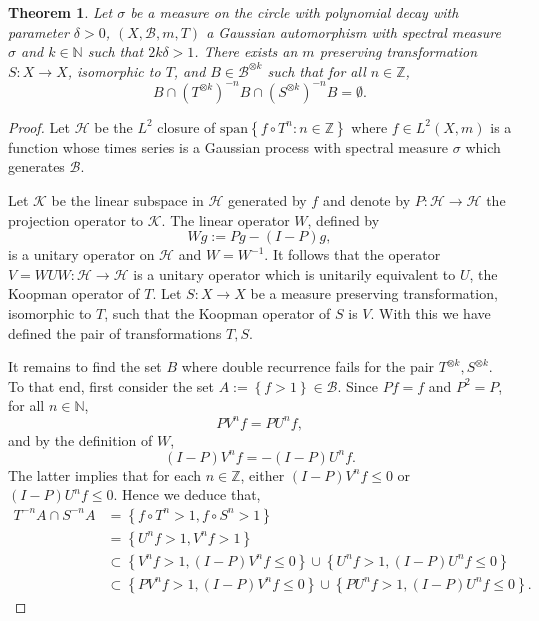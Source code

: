 \documentclass[12pt,reqno]{amsart}
\newcommand{\N}{\mathbb{N}}
\newcommand{\Z}{\mathbb{Z}}
\newcommand{\B}{\mathcal{B}}
\newtheorem{thm}{Theorem}[section]
\theoremstyle{definition}
\begin{document}
\begin{thm}\label{thm: Gaussian no rec}
Let $\sigma$ be a measure on the circle with polynomial decay with parameter $\delta>0$, $\left(X,\mathcal{B},m,T\right)$ a Gaussian automorphism with spectral measure $\sigma$ and $k\in\mathbb{N}$ such that $2k\delta>1$. There exists an $m$ preserving transformation $S:X\to X$, isomorphic to $T$, and  $B\in\B^{\otimes k}$ such that for all $n\in\Z$, 
\[
B\cap \left(T^{\otimes k}\right)^{-n}B\cap \left(S^{\otimes k}\right)^{-n}B = \emptyset. 
\]
\end{thm}
\begin{proof}
Let $\mathcal{H}$ be the $L^2$ closure of $\mathrm{span}\left\{f\circ T^n:n\in\Z\right\}$ where $f\in L^2(X,m)$ is a function whose times series is a Gaussian process with spectral measure $\sigma$ which generates $\mathcal{B}$. 

Let  $\mathcal{K}$ be the linear subspace in $\mathcal{H}$ generated by $f$ and denote by $P:\mathcal{H}\to \mathcal{H}$ the projection operator to $\mathcal{K}$. The linear operator $W$, defined by
\[
Wg:=P g-(I-P)g,
\]
is a unitary operator on $\mathcal{H}$ and $W=W^{-1}$. It follows that the operator $V=WUW:\mathcal{H}\to\mathcal{H}$ is a unitary operator which is unitarily equivalent to $U$, the Koopman operator of $T$. Let $S:X\to X$ be a measure preserving transformation, isomorphic to $T$, such that the Koopman operator of $S$ is $V$. With this we have defined the pair of transformations $T,S$. 

It remains to find the set $B$ where double recurrence fails for the pair $T^{\otimes k},S^{\otimes k}$. To that end, first consider the set $A:=\left\{f>1\right\}\in\mathcal{B}$. Since $Pf=f$ and $P^2=P$, for all $n\in \N$,
\begin{equation}\label{eq: Proj of U and V}
PV^nf=PU^nf,    
\end{equation}
and by the definition of $W$,
\[
(I-P)V^nf=-(I-P)U^nf.
\]
The latter implies that for each $n\in \Z$, either $(I-P)V^nf\leq 0$ or $(I-P)U^nf\leq 0$. Hence we deduce that,
\begin{align*}
T^{-n}A\cap S^{-n}A&=\left\{f\circ T^n>1,f\circ S^n>1\right\}\\
&=\left\{U^nf>1,V^nf>1\right\}\\
&\subset\left\{V^nf>1,(I-P)V^nf\leq 0\right\}\cup \left\{U^nf>1,(I-P)U^nf\leq 0\right\}\\
&\subset \left\{PV^nf>1,(I-P)V^nf\leq 0\right\}\cup \left\{PU^nf>1,(I-P)U^nf\leq 0\right\}.
\end{align*}


\end{proof}
\end{document}
